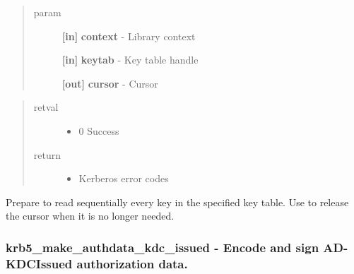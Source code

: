 \documentclass[letterpaper,10pt,english]{sphinxmanual}
\begin{document}
\begin{fulllineitems}
\label{appdev/refs/api/krb5_kt_start_seq_get:c.krb5_kt_start_seq_get}
\end{fulllineitems}

\begin{quote}\begin{description}
\item[{param}] \leavevmode
\textbf{{[}in{]}} \textbf{context} - Library context

\textbf{{[}in{]}} \textbf{keytab} - Key table handle

\textbf{{[}out{]}} \textbf{cursor} - Cursor

\end{description}\end{quote}
\begin{quote}\begin{description}
\item[{retval}] \leavevmode\begin{itemize}
\item {} 
0   Success

\end{itemize}

\item[{return}] \leavevmode\begin{itemize}
\item {} 
Kerberos error codes

\end{itemize}

\end{description}\end{quote}

Prepare to read sequentially every key in the specified key table. Use {\hyperref[appdev/refs/api/krb5_kt_end_seq_get:c.krb5_kt_end_seq_get]{}} to release the cursor when it is no longer needed.


\subsubsection{krb5\_make\_authdata\_kdc\_issued -  Encode and sign AD-KDCIssued authorization data.}
\label{appdev/refs/api/krb5_make_authdata_kdc_issued:krb5-make-authdata-kdc-issued-encode-and-sign-ad-kdcissued-authorization-data}\label{appdev/refs/api/krb5_make_authdata_kdc_issued::doc}
\end{document}
